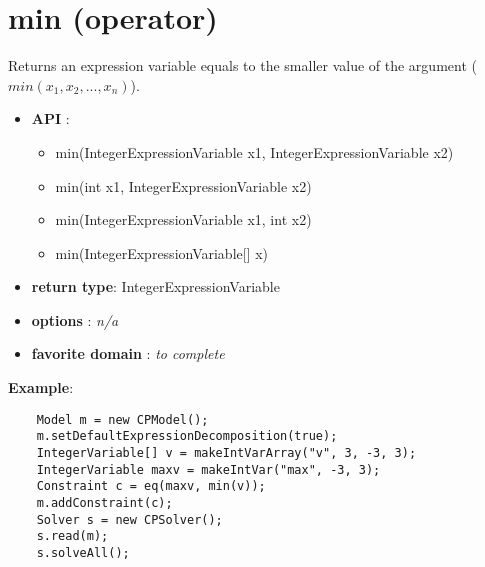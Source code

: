 
\section{min (operator)}\label{min:minoperator}\hypertarget{min:minoperator}{}
Returns an expression variable equals to the smaller value of the argument (\(min(x_1, x_2, ..., x_n)\)).

\begin{itemize}
	\item \textbf{API} :
	\begin{itemize}
		\item min(IntegerExpressionVariable x1, IntegerExpressionVariable x2)
		\item min(int x1, IntegerExpressionVariable x2)
		\item min(IntegerExpressionVariable x1, int x2)
		\item min(IntegerExpressionVariable[] x)
	\end{itemize}
	\item \textbf{return type}: IntegerExpressionVariable
	\item \textbf{options} : \emph{n/a}
	\item \textbf{favorite domain} : \emph{to complete}
\end{itemize}

\textbf{Example}:
\begin{lstlisting}
	Model m = new CPModel();
	m.setDefaultExpressionDecomposition(true);
	IntegerVariable[] v = makeIntVarArray("v", 3, -3, 3);
	IntegerVariable maxv = makeIntVar("max", -3, 3);
	Constraint c = eq(maxv, min(v));
	m.addConstraint(c);
	Solver s = new CPSolver();
	s.read(m);
	s.solveAll();
\end{lstlisting}

